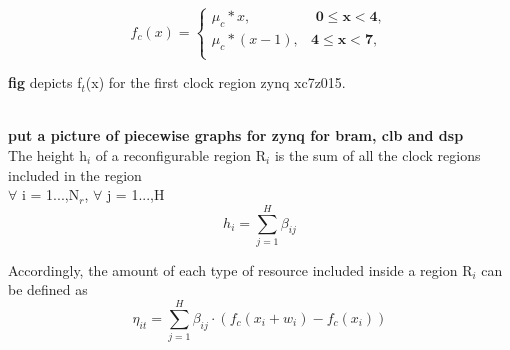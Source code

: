 \begin{equation}
f_c(x) = \begin{cases}
\mu_c * x, & \textbf{ 0$\leq$x$<$4}, \\
\mu_c * (x-1), & \textbf{4$\leq$x$<$7}, \\
\end{cases}
\end{equation}

\textbf{fig} depicts f$_t$(x) for the first clock region zynq xc7z015.

\textbf{\\put a picture of piecewise graphs for zynq for bram, clb and dsp} \\

The height h$_i$ of a reconfigurable region R$_i$ is the sum of all the clock regions included in the region \\
$\forall$ i = 1...,N$_r$, $\forall$ j = 1...,H
\begin{equation}
 h_i = \sum_{j=1}^{H} \beta_{ij}
\end{equation}

Accordingly, the amount of each type of resource included inside a region R$_i$ can be defined as \\
\begin{equation}
\eta_{it} = \sum_{j=1}^{H} \beta_{ij} \cdot (f_c(x_i+w_i) - f_c(x_i))
\label{clb_tot}
\end{equation}

\begin{comment}
The set of components that must not be included in 
A reconfigurable region R$_i$ must, at the very least, incorporate the resources required by the largest reconfigurable module that it hosts. Reconfigurable regions are rectangular in shape and to ease the routing during implementation, the height of the reconfigurable region must be aligned to clock region boundaries.\\
\end{comment}
